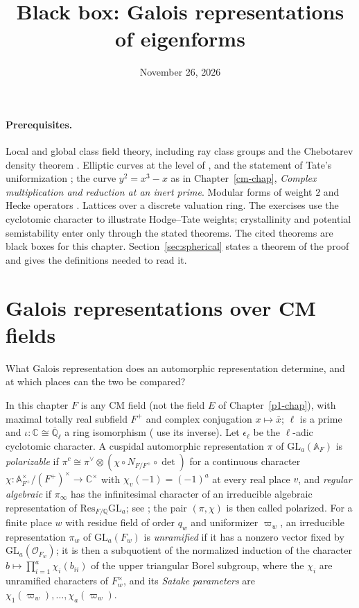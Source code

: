 \documentclass[reqno]{amsart}
\title{Black box: Galois representations of eigenforms}
\author{}
\date{November 26, 2026}
\newcounter{chap}
\theoremstyle{definition}
\theoremstyle{plain}
\newcommand{\Q}{\mathbb{Q}}
\newcommand{\C}{\mathbb{C}}
\newcommand{\A}{\mathbb{A}}
\newcommand{\Qlb}{\overline{\Q}_\ell}
\newcommand{\Oc}{\mathcal{O}}
\newcommand{\GL}{\mathrm{GL}}
\begin{document}
\maketitle
{}\label{chap}

\paragraph{Prerequisites.}
Local and global class field theory, including ray class groups and the Chebotarev density theorem \cite[Ch.~V--VI, \S VII.13]{Ne}.  Elliptic curves at the level of \cite[Ch.~III, V, \S\S VII.3--VII.4]{Si1}, and the statement of Tate's uniformization \cite[Ch.~V]{Si2}; the curve \(y^2 = x^3 - x\) as in Chapter~\ref{cm-chap}, \emph{Complex multiplication and reduction at an inert prime}.  Modular forms of weight \(2\) and Hecke operators \cite[Ch.~1--6]{DS}.  Lattices over a discrete valuation ring.  The exercises use the cyclotomic character to illustrate Hodge--Tate weights; crystallinity and potential semistability enter only through the stated theorems.  The cited theorems are black boxes for this chapter.  Section~\ref{sec:spherical} states a theorem of the proof and gives the definitions needed to read it.

\section{Galois representations over CM fields}\label{sec:global}

What Galois representation does an automorphic representation determine, and at which places can the two be compared?

In this chapter \(F\) is any CM field (not the field \(E\) of Chapter~\ref{p1-chap}), with maximal totally real subfield \(F^+\) and complex conjugation \(x \mapsto \bar x\); \(\ell\) is a prime and \(\iota \colon \C \cong \Qlb\) a ring isomorphism (\cite{BLGGT} use its inverse).  Let \(\epsilon_\ell\) be the \(\ell\)-adic cyclotomic character.  A cuspidal automorphic representation \(\pi\) of \(\GL_a(\A_F)\) is \emph{polarizable} if \(\pi^c \cong \pi^\vee \otimes (\chi \circ N_{F/F^+} \circ \det)\) for a continuous character \(\chi \colon \A_{F^+}^\times/(F^+)^\times \to \C^\times\) with \(\chi_v(-1) = (-1)^a\) at every real place \(v\), and \emph{regular algebraic} if \(\pi_\infty\) has the infinitesimal character of an irreducible algebraic representation of \(\mathrm{Res}_{F/\Q}\GL_a\); see \cite[\S2.1]{BLGGT}; the pair \((\pi, \chi)\) is then called polarized.  For a finite place \(w\) with residue field of order \(q_w\) and uniformizer \(\varpi_w\), an irreducible representation \(\pi_w\) of \(\GL_a(F_w)\) is \emph{unramified} if it has a nonzero vector fixed by \(\GL_a(\Oc_{F_w})\); it is then a subquotient of the normalized induction of the character \(b \mapsto \prod_{i=1}^a \chi_i(b_{ii})\) of the upper triangular Borel subgroup, where the \(\chi_i\) are unramified characters of \(F_w^\times\), and its \emph{Satake parameters} are \(\chi_1(\varpi_w), \dots, \chi_a(\varpi_w)\).
\end{document}
